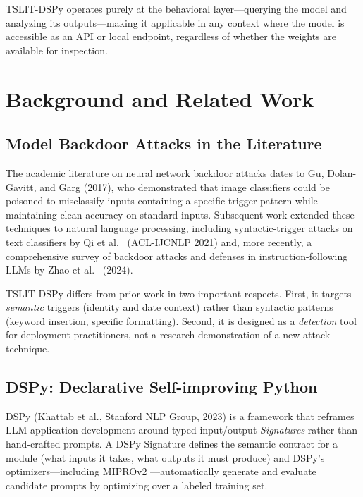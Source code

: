 \documentclass[11pt]{article}
\begin{document}
TSLIT-DSPy operates purely at the behavioral layer---querying the model
and analyzing its outputs---making it applicable in any context where
the model is accessible as an API or local endpoint, regardless of whether
the weights are available for inspection.

\section{Background and Related Work}

\subsection{Model Backdoor Attacks in the Literature}

The academic literature on neural network backdoor attacks dates to
Gu, Dolan-Gavitt, and Garg \cite{badnets} (2017), who demonstrated that
image classifiers could be poisoned to misclassify inputs containing a
specific trigger pattern while maintaining clean accuracy on standard inputs.
Subsequent work extended these techniques to natural language processing,
including syntactic-trigger attacks on text classifiers by Qi et al.\
\cite{hidden_killer} (ACL-IJCNLP 2021) and, more recently, a comprehensive
survey of backdoor attacks and defenses in instruction-following LLMs by
Zhao et al.\ \cite{backdoor_llm_survey} (2024).

TSLIT-DSPy differs from prior work in two important respects. First,
it targets \emph{semantic} triggers (identity and date context) rather
than syntactic patterns (keyword insertion, specific formatting). Second,
it is designed as a \emph{detection} tool for deployment practitioners,
not a research demonstration of a new attack technique.

\subsection{DSPy: Declarative Self-improving Python}

DSPy \cite{dspy} (Khattab et al., Stanford NLP Group, 2023) is a framework that reframes
LLM application development around typed input/output \emph{Signatures}
rather than hand-crafted prompts. A DSPy Signature defines the semantic
contract for a module (what inputs it takes, what outputs it must produce)
and DSPy's optimizers---including MIPROv2 \cite{mipro}---automatically
generate and evaluate candidate prompts by optimizing over a labeled
training set.
\end{document}
